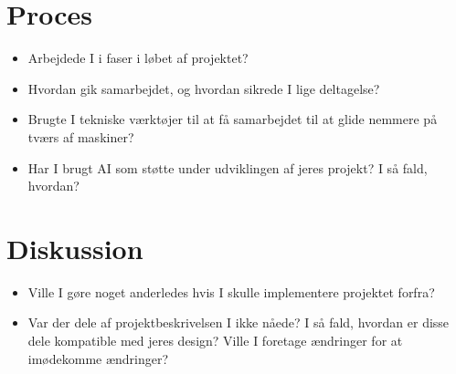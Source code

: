 \documentclass{article}
\theoremstyle{mytheoremstyle}
\theoremstyle{mytheoremstyle}
\theoremstyle{myproblemstyle}
\begin{document}
\section{Proces}\label{sec:Proces} %
\begin{itemize}
  \item Arbejdede I i faser i løbet af projektet?
  \item Hvordan gik samarbejdet, og hvordan sikrede I lige deltagelse?
  \item Brugte I tekniske værktøjer til at få samarbejdet til at glide nemmere
  på tværs af maskiner?
  \item Har I brugt AI som støtte under udviklingen af jeres projekt? I så fald,
  hvordan?
\end{itemize}

\section{Diskussion}\label{sec:Diskussion} %
\begin{itemize}
  \item Ville I gøre noget anderledes hvis I skulle implementere projektet
  forfra?
  \item Var der dele af projektbeskrivelsen I ikke nåede? I så fald, hvordan er
  disse dele kompatible med jeres design? Ville I foretage ændringer for at
  imødekomme ændringer?
\end{itemize}
\end{document}
